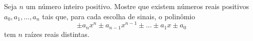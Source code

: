 Seja \(n\) um número inteiro positivo. Mostre que existem números reais positivos \(a_0, a_1, \dots, a_n\) tais que, para cada escolha de sinais, o polinômio
\[\pm a_nx^n\pm a_{n-1}x^{n-1} \pm \dots \pm a_1x \pm a_0\]
tem \(n\) raízes reais distintas.

